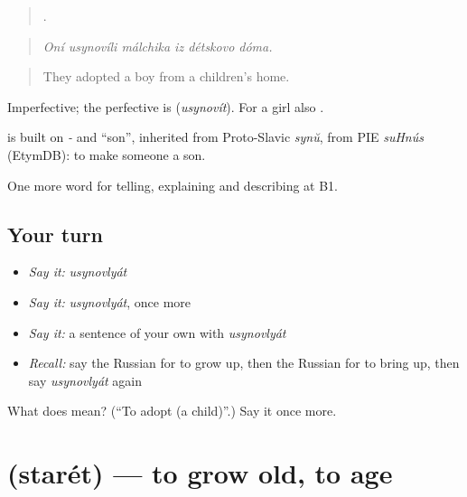 \begin{quote}
     .
\end{quote}

\begin{quote}
\emph{Oní usynovíli málchika iz détskovo dóma.}
\end{quote}

\begin{quote}
They adopted a boy from a children's home.
\end{quote}

Imperfective; the perfective is \emph{} (\emph{usynovít}). For a girl also \emph{}.

\begin{cousinweb}
\emph{} is built on \emph{-} and \emph{} \textquotedblleft{}son\textquotedblright{}, inherited from Proto-Slavic \emph{synŭ}, from PIE \emph{suHnús} (EtymDB): to make someone a son.
\end{cousinweb}

\begin{grammarlens}[title={What you've built}]
One more word for telling, explaining and describing at B1.
\end{grammarlens}

\subsection*{Your turn}
\begin{itemize}
\raggedright
  \item \emph{Say it:} \emph{usynovlyát}
  \item \emph{Say it:} \emph{usynovlyát}, once more
  \item \emph{Say it:} a sentence of your own with \emph{usynovlyát}
  \item \emph{Recall:} say the Russian for to grow up, then the Russian for to bring up, then say \emph{usynovlyát} again
\end{itemize}

\begin{tcolorbox}[breakable,colback=teal!4,colframe=teal!35!black,title={Before you move on}]
What does  mean? (\textquotedblleft{}To adopt (a child)\textquotedblright{}.) Say it once more.
\end{tcolorbox}
\section[\texorpdfstring{\ru{стареть} (starét)}{стареть (starét)}]{ (starét) — to grow old, to age}

